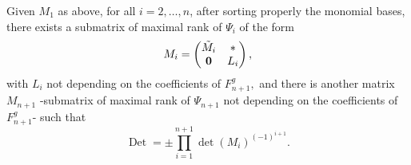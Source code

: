 \documentclass[10pt,a4paper]{amsart}
\newcommand{\Det}{\operatorname{Det}}
\begin{document}
\begin{proposition}\label{lab}
Given $M_1$ as above, for all $i=2,\ldots, n$, after sorting properly the monomial bases, there exists a submatrix of maximal rank of $\Psi_{i}$ of the form
$$M_i=\begin{pmatrix}
\tilde{M}_i& *\\
{\bf0}& L_i
\end{pmatrix},
$$
with $L_i$ not depending on the coefficients of $F^g_{n+1},$ and  there is another matrix $M_{n+1}$ -submatrix of maximal rank of $\Psi_{n+1}$ not depending on the coefficients of $F^g_{n+1}$- such that
\begin{equation}\label{det}
\Det =\pm\prod_{i=1}^{n+1} \det(M_i)^{(-1)^{i+1}}.
\end{equation}
\end{proposition}
\end{document}
